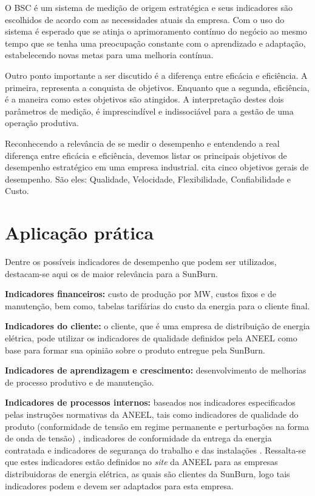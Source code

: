 O BSC é um sistema de medição de origem estratégica e seus indicadores são escolhidos de acordo com as necessidades atuais da empresa. Com o uso do sistema é esperado que se atinja o aprimoramento contínuo do negócio ao mesmo tempo que se tenha uma preocupação constante com o aprendizado e adaptação, estabelecendo novas metas para uma melhoria contínua.

Outro ponto importante a ser discutido é a diferença entre eficácia e eficiência. A primeira, representa a conquista de objetivos. Enquanto que a segunda, eficiência, é a maneira como estes objetivos são atingidos. A interpretação destes dois parâmetros de medição, é imprescindível e indissociável para a gestão de uma operação produtiva.

Reconhecendo a relevância de se medir o desempenho e entendendo a real diferença entre eficácia e eficiência, devemos listar os principais objetivos de desempenho estratégico em uma empresa industrial. %
\cite{slack2006administracao} cita cinco objetivos gerais de desempenho. São eles: Qualidade, Velocidade, Flexibilidade, Confiabilidade e Custo.

\section{Aplicação prática}
\label{sec:estrategia_da_producao_aplicacao}
Dentre os possíveis indicadores de desempenho que podem ser utilizados, destacam-se aqui os de maior relevância para a SunBurn.

\textbf{Indicadores financeiros:} custo de produção por MW, custos fixos e de manutenção, bem como, tabelas tarifárias do custo da energia para o cliente final.

\textbf{Indicadores do cliente:} o cliente, que é uma empresa de distribuição de energia elétrica, pode utilizar os indicadores de qualidade definidos pela \ac{ANEEL} como base para formar sua opinião sobre o produto entregue pela SunBurn.

\textbf{Indicadores de aprendizagem e crescimento:} desenvolvimento de melhorias de processo produtivo e de manutenção.

\textbf{Indicadores de processos internos:} baseados nos indicadores especificados pelas instruções normativas da \ac{ANEEL}, tais como indicadores de qualidade do produto (conformidade de tensão em regime permanente e perturbações na forma de onda de tensão) \cite{ANEEL_Produto}, indicadores de conformidade da entrega da energia contratada \cite{ANEEL_Continuidade} e indicadores de segurança do trabalho e das instalações \cite{ANEEL_Seguranca}. Ressalta-se que estes indicadores estão definidos no \textit{site} da \ac{ANEEL} para as empresas distribuidoras de energia elétrica, as quais são clientes da SunBurn, logo tais indicadores podem e devem ser adaptados para esta empresa.
